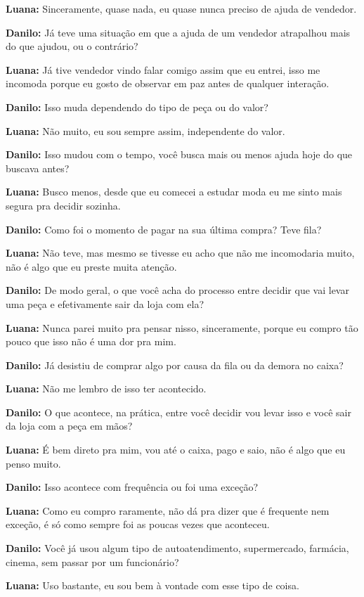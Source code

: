 \textbf{Luana:} Sinceramente, quase nada, eu quase nunca preciso de ajuda de vendedor.

\textbf{Danilo:} Já teve uma situação em que a ajuda de um vendedor atrapalhou mais do que ajudou, ou o contrário?

\textbf{Luana:} Já tive vendedor vindo falar comigo assim que eu entrei, isso me incomoda porque eu gosto de observar em paz antes de qualquer interação.

\textbf{Danilo:} Isso muda dependendo do tipo de peça ou do valor?

\textbf{Luana:} Não muito, eu sou sempre assim, independente do valor.

\textbf{Danilo:} Isso mudou com o tempo, você busca mais ou menos ajuda hoje do que buscava antes?

\textbf{Luana:} Busco menos, desde que eu comecei a estudar moda eu me sinto mais segura pra decidir sozinha.

\textbf{Danilo:} Como foi o momento de pagar na sua última compra? Teve fila?

\textbf{Luana:} Não teve, mas mesmo se tivesse eu acho que não me incomodaria muito, não é algo que eu preste muita atenção.

\textbf{Danilo:} De modo geral, o que você acha do processo entre decidir que vai levar uma peça e efetivamente sair da loja com ela?

\textbf{Luana:} Nunca parei muito pra pensar nisso, sinceramente, porque eu compro tão pouco que isso não é uma dor pra mim.

\textbf{Danilo:} Já desistiu de comprar algo por causa da fila ou da demora no caixa?

\textbf{Luana:} Não me lembro de isso ter acontecido.

\textbf{Danilo:} O que acontece, na prática, entre você decidir vou levar isso e você sair da loja com a peça em mãos?

\textbf{Luana:} É bem direto pra mim, vou até o caixa, pago e saio, não é algo que eu penso muito.

\textbf{Danilo:} Isso acontece com frequência ou foi uma exceção?

\textbf{Luana:} Como eu compro raramente, não dá pra dizer que é frequente nem exceção, é só como sempre foi as poucas vezes que aconteceu.

\textbf{Danilo:} Você já usou algum tipo de autoatendimento, supermercado, farmácia, cinema, sem passar por um funcionário?

\textbf{Luana:} Uso bastante, eu sou bem à vontade com esse tipo de coisa.

